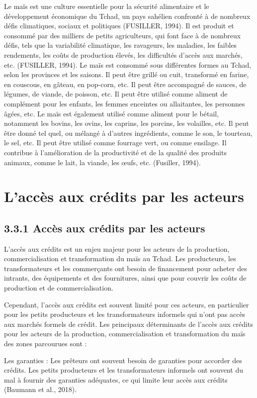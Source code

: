 \documentclass[12pt,oneside]{report}
\begin{document}
Le maïs est une culture essentielle pour la sécurité alimentaire et le développement économique du Tchad, un pays sahélien confronté à de nombreux défis climatiques, sociaux et politiques (FUSILLER, 1994). Il est produit et consommé par des milliers de petits agriculteurs, qui font face à de nombreux défis, tels que la variabilité climatique, les ravageurs, les maladies, les faibles rendements, les coûts de production élevés, les difficultés d'accès aux marchés, etc. (FUSILLER, 1994). Le maïs est consommé sous différentes formes au Tchad, selon les provinces et les saisons. Il peut être grillé ou cuit, transformé en farine, en couscous, en gâteau, en pop-corn, etc. Il peut être accompagné de sauces, de légumes, de viande, de poisson, etc. Il peut être utilisé comme aliment de complément pour les enfants, les femmes enceintes ou allaitantes, les personnes âgées, etc. Le maïs est également utilisé comme aliment pour le bétail, notamment les bovins, les ovins, les caprins, les porcins, les volailles, etc. Il peut être donné tel quel, ou mélangé à d'autres ingrédients, comme le son, le tourteau, le sel, etc. Il peut être utilisé comme fourrage vert, ou comme ensilage. Il contribue à l'amélioration de la productivité et de la qualité des produits animaux, comme le lait, la viande, les œufs, etc. (Fusiller, 1994).

\section{L’accès aux crédits par les acteurs}
\subsection{3.3.1 Accès aux crédits par les acteurs}
L'accès aux crédits est un enjeu majeur pour les acteurs de la production, commercialisation et transformation du maïs au Tchad. Les producteurs, les transformateurs et les commerçants ont besoin de financement pour acheter des intrants, des équipements et des fournitures, ainsi que pour couvrir les coûts de production et de commercialisation.

Cependant, l'accès aux crédits est souvent limité pour ces acteurs, en particulier pour les petits producteurs et les transformateurs informels qui n'ont pas accès aux marchés formels de crédit. Les principaux déterminants de l'accès aux crédits pour les acteurs de la production, commercialisation et transformation du maïs des zones parcourues sont :

Les garanties : Les prêteurs ont souvent besoin de garanties pour accorder des crédits. Les petits producteurs et les transformateurs informels ont souvent du mal à fournir des garanties adéquates, ce qui limite leur accès aux crédits (Baumann et al., 2018).
\end{document}
